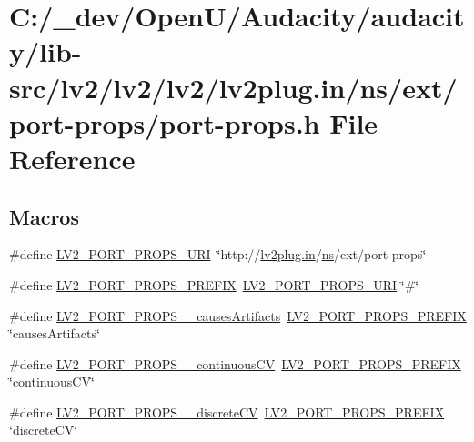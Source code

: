 \hypertarget{port-props_8h}{}\section{C\+:/\+\_\+dev/\+Open\+U/\+Audacity/audacity/lib-\/src/lv2/lv2/lv2/lv2plug.in/ns/ext/port-\/props/port-\/props.h File Reference}
\label{port-props_8h}
\subsection*{Macros}
\begin{DoxyCompactItemize}
\item 
\#define \hyperlink{port-props_8h_a2772d53568f74c7f36e095c2c913fd04}{L\+V2\+\_\+\+P\+O\+R\+T\+\_\+\+P\+R\+O\+P\+S\+\_\+\+U\+RI}~\char`\"{}http\+://\hyperlink{latency_8c_a7d946209d777cb95fe30364b8d321207}{lv2plug.\+in}/\hyperlink{xmltok_8c_ab6aec1346fb6c7b2733f0f73c9536ad2}{ns}/ext/port-\/props\char`\"{}
\item 
\#define \hyperlink{port-props_8h_ab06a532dc01863154fb741425a78f45e}{L\+V2\+\_\+\+P\+O\+R\+T\+\_\+\+P\+R\+O\+P\+S\+\_\+\+P\+R\+E\+F\+IX}~\hyperlink{port-props_8h_a2772d53568f74c7f36e095c2c913fd04}{L\+V2\+\_\+\+P\+O\+R\+T\+\_\+\+P\+R\+O\+P\+S\+\_\+\+U\+RI} \char`\"{}\#\char`\"{}
\item 
\#define \hyperlink{port-props_8h_a34689601db4fc8071f63596825e3d6cc}{L\+V2\+\_\+\+P\+O\+R\+T\+\_\+\+P\+R\+O\+P\+S\+\_\+\+\_\+causes\+Artifacts}~\hyperlink{port-props_8h_ab06a532dc01863154fb741425a78f45e}{L\+V2\+\_\+\+P\+O\+R\+T\+\_\+\+P\+R\+O\+P\+S\+\_\+\+P\+R\+E\+F\+IX} \char`\"{}causes\+Artifacts\char`\"{}
\item 
\#define \hyperlink{port-props_8h_a4478b8b9e3372d159de0a5deac8e7239}{L\+V2\+\_\+\+P\+O\+R\+T\+\_\+\+P\+R\+O\+P\+S\+\_\+\+\_\+continuous\+CV}~\hyperlink{port-props_8h_ab06a532dc01863154fb741425a78f45e}{L\+V2\+\_\+\+P\+O\+R\+T\+\_\+\+P\+R\+O\+P\+S\+\_\+\+P\+R\+E\+F\+IX} \char`\"{}continuous\+CV\char`\"{}
\item 
\#define \hyperlink{port-props_8h_af479ce9771200a7c1ded6779b940daa5}{L\+V2\+\_\+\+P\+O\+R\+T\+\_\+\+P\+R\+O\+P\+S\+\_\+\+\_\+discrete\+CV}~\hyperlink{port-props_8h_ab06a532dc01863154fb741425a78f45e}{L\+V2\+\_\+\+P\+O\+R\+T\+\_\+\+P\+R\+O\+P\+S\+\_\+\+P\+R\+E\+F\+IX} \char`\"{}discrete\+CV\char`\"{}
\item 

\end{DoxyCompactItemize}
